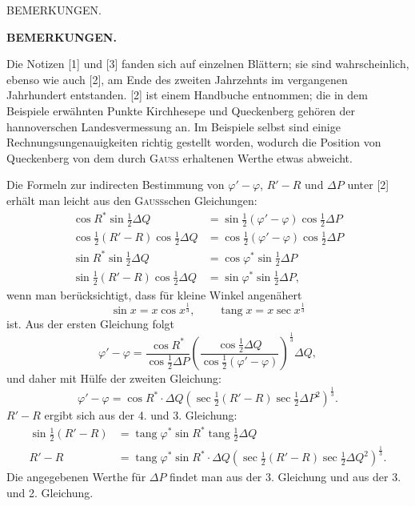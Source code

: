 \clearpage
{}\hfill BEMERKUNGEN.\hfill\mbox{}\par
\vspace{12mm}
\begin{center}\textbf{BEMERKUNGEN.}\end{center}
{\small
Die Notizen [1] und [3] fanden sich auf einzelnen Blättern; sie sind wahrscheinlich, ebenso wie auch [2], am Ende des zweiten Jahrzehnts im vergangenen Jahrhundert entstanden. [2] ist einem Handbuche entnommen; die in dem Beispiele erwähnten Punkte Kirchhesepe und Queckenberg gehören der hannoverschen Landesvermessung an. Im Beispiele selbst sind einige Rechnungsungenauigkeiten richtig gestellt worden, wodurch die Position von Queckenberg von dem durch \textsc{Gauss} erhaltenen Werthe etwas abweicht.

Die Formeln zur indirecten Bestimmung von $\varphi'-\varphi$, $R'-R$ und $\Delta P$ unter [2] erhält man leicht aus den \textsc{Gauss}schen Gleichungen:
\[
\begin{aligned}
\cos R^*\sin\tfrac12\Delta Q&=\sin\tfrac12(\varphi'-\varphi)\cos\tfrac12\Delta P\\
\cos\tfrac12(R'-R)\cos\tfrac12\Delta Q&=\cos\tfrac12(\varphi'-\varphi)\cos\tfrac12\Delta P\\
\sin R^*\sin\tfrac12\Delta Q&=\cos\varphi^*\sin\tfrac12\Delta P\\
\sin\tfrac12(R'-R)\cos\tfrac12\Delta Q&=\sin\varphi^*\sin\tfrac12\Delta P,
\end{aligned}
\]
wenn man berücksichtigt, dass für kleine Winkel angenähert
\[
\sin x=x\cos x^{\frac13},\qquad\operatorname{tang}x=x\sec x^{\frac13}
\]
ist. Aus der ersten Gleichung folgt
\[
\varphi'-\varphi=\frac{\cos R^*}{\cos\tfrac12\Delta P}\left(\frac{\cos\tfrac12\Delta Q}{\cos\tfrac12(\varphi'-\varphi)}\right)^{\frac13}\Delta Q,
\]
und daher mit Hülfe der zweiten Gleichung:
\[
\varphi'-\varphi=\cos R^*\cdot\Delta Q(\sec\tfrac12(R'-R)\sec\tfrac12\Delta P^2)^{\frac13}.
\]
$R'-R$ ergibt sich aus der 4. und 3. Gleichung:
\[
\begin{aligned}
\sin\tfrac12(R'-R)&=\operatorname{tang}\varphi^*\sin R^*\operatorname{tang}\tfrac12\Delta Q\\
R'-R&=\operatorname{tang}\varphi^*\sin R^*\cdot\Delta Q(\sec\tfrac12(R'-R)\sec\tfrac12\Delta Q^2)^{\frac13}.
\end{aligned}
\]
Die angegebenen Werthe für $\Delta P$ findet man aus der 3. Gleichung und aus der 3. und 2. Gleichung.

}
